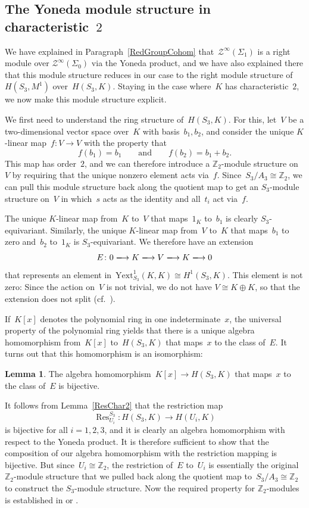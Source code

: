 \documentclass[12pt]{article}
\makeatletter
\theoremstyle{definition}
\newtheorem{Lemma}[Satz]{Lemma}
\theoremstyle{break}
\renewenvironment{proof}[1][\proofname]{\par
\vspace{-5pt}%
\pushQED{\qed}%
\normalfont
\topsep0pt \partopsep0pt %
\trivlist
\item[\hskip\labelsep
\bfseries
#1\@addpunct{.}]\ignorespaces
}{%
\popQED\endtrivlist\@endpefalse
\addvspace{6pt plus 6pt} %
}
\newcommand{\Z}{\mathbb{Z}}
\DeclareMathOperator\Res{Res}
\newcommand{\Yext}{\mathrm{Yext}}
\renewcommand{\1}{\mathbbm{1}}
\newcommand{\TFT}{\mathcal{Z}}
\makeatother
\begin{document}
\subsection{The Yoneda module structure in characteristic~$2$} \label{YonChar2}
We have explained in Paragraph~\ref{RedGroupCohom} that~$\TFT^\infty(\Sigma_1)$ is a right module over $\TFT^\infty(\Sigma_0)$ via the Yoneda product, and we have also explained there that this module structure reduces in our case to the right module structure of~$H(S_3, M^1)$ over~$H(S_3, K)$. Staying in the case where~$K$ has characteristic~$2$, we now make this module structure explicit.

We first need to understand the ring structure of~$H(S_3, K)$. For this, let~$V$ be a two-dimensional vector space over~$K$ with basis~$b_1,b_2$, and consider the unique $K$-linear map~$f \colon V \to V$ with the property that
\[f(b_1) = b_1 \qquad \text{and} \qquad f(b_2) = b_1 + b_2.\]
This map has order~$2$, and we can therefore introduce a $\Z_2$-module structure on~$V$ by requiring that the unique nonzero element acts via~$f$. Since~$S_3/A_3 \cong \Z_2$, we can pull this module structure back along the quotient map to get an $S_3$-module structure on~$V$ in which~$s$ acts as the identity and all~$t_i$ act via~$f$.

The unique $K$-linear map from~$K$ to~$V$ that maps~$1_K$ to~$b_1$ is clearly $S_3$-equivariant. Similarly, the unique $K$-linear map from~$V$ to~$K$ that maps~$b_1$ to zero and~$b_2$ to~$1_K$ is $S_3$-equivariant. We therefore have an extension
\[E \colon 0 \xlongrightarrow{} K \xlongrightarrow{} V \xlongrightarrow{} K
\xlongrightarrow{} 0\]
that represents an element in~$\Yext_{S_3}^1(K,K) \cong H^1(S_3, K)$. This element is not zero: Since the action on~$V$ is not trivial, we do not have $V \cong K \oplus K$, so that the extension does not split (cf.~\cite[Chap.~III, Sec.~2, p.~93]{HiS}).

If~$K[x]$ denotes the polynomial ring in one indeterminate~$x$, the universal property of the polynomial ring yields that there is a unique algebra homomorphism from~$K[x]$ to~$H(S_3, K)$ that maps~$x$ to the class of~$E$. It turns out that this homomorphism is an isomorphism:
\begin{Lemma} \label{IsomChar2}
The algebra homomorphism~$K[x] \to H(S_3, K)$ that maps~$x$ to the class of~$E$ is bijective.
\end{Lemma}
\begin{proof}
It follows from Lemma~\ref{ResChar2} that the restriction map
\[\Res^{S_3}_{U_i} \colon H(S_3, K) \to H(U_i, K)\]
is bijective for all $i=1,2,3$, and it is clearly an algebra homomorphism with respect to the Yoneda product. It is therefore sufficient to show that the composition of our algebra homomorphism with the restriction mapping is bijective. But since~$U_i \cong \Z_2$, the restriction of~$E$ to~$U_i$ is essentially the original $\Z_2$-module structure that we pulled back along the quotient map to~$S_3/A_3 \cong \Z_2$ to construct the $S_3$-module structure. Now the required property for $\Z_2$-modules is established in \cite[Prop.~3.5.5, p.~67]{Be} or \cite[Sec.~3.2, p.~26]{E}.
\end{proof}
\end{document}
